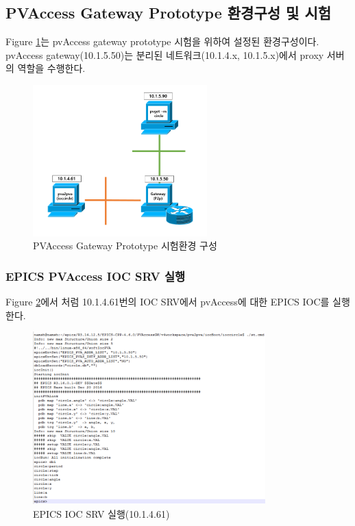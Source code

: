 \documentclass[11pt
  , a4paper
  , article
  , oneside
]{memoir}
\begin{document}
\subsection{PVAccess Gateway Prototype 환경구성 및 시험}
Figure \ref{fig:gw_env}는 pvAccess gateway prototype 시험을 위하여 설정된 환경구성이다. pvAccess gateway(10.1.5.50)는 분리된 네트워크(10.1.4.x, 10.1.5.x)에서 proxy 서버의 역할을 수행한다. 

\begin{figure}[!htb]
	\centering
	\includegraphics[width=0.6\textwidth, height=0.4\textheight]{./images/gw_env.png}
	\caption{
		PVAccess Gateway Prototype 시험환경 구성
	}		
	\label{fig:gw_env}   
\end{figure}


\clearpage
\subsubsection{EPICS PVAccess IOC SRV 실행}
Figure \ref{fig:ioc}에서 처럼 10.1.4.61번의 IOC SRV에서 pvAccess에 대한 EPICS IOC를 실행한다. 

\begin{figure}[!htb]
	\centering
	\includegraphics[width=0.8\textwidth, height=0.5\textheight]{./images/ioc.png}
	\caption{
		EPICS IOC SRV 실행(10.1.4.61)
	}		
	\label{fig:ioc}   
\end{figure}
\end{document}
